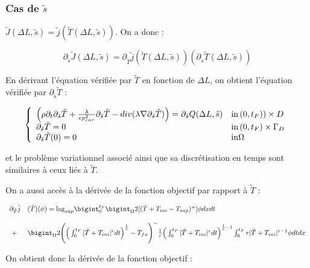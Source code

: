 \documentclass[11pt,a4paper]{article}
\begin{document}
\subsubsection*{Cas de $\tilde{s}$}

$\tilde{J}(\Delta L,\tilde{s})=\tilde{j}(\tilde{T}(\Delta L,\tilde{s}))$. On a donc :

\begin{equation}
\partial_{\tilde{s}}\tilde{J}(\Delta L,\tilde{s})=\partial_{\tilde{T}}\tilde{j}(\tilde{T}(\Delta L,\tilde{s}))(\partial_{\tilde{s}}\tilde{T}(\Delta L,\tilde{s}))
\end{equation}

En dérivant l'équation vérifiée par $\tilde{T}$ en fonction de $\Delta L$, on obtient l'équation vérifiée par $\partial_{\tilde{s}}\tilde{T}$ :

\begin{equation}
\label{eq:ChaleurDerTildes}
\left\{\begin{array}{ll}
	\Big(\rho\partial_t \partial_{\tilde{s}}\tilde{T}+\frac{\lambda}{ep_{car}^2} \partial_{\tilde{s}}\tilde{T}-div(\lambda\nabla \partial_{\tilde{s}}\tilde{T})\Big)=\partial_{\tilde{s}}Q(\Delta L,\tilde{s})& \textrm{in\,}(0,t_F))\times D \\
	\partial_{\tilde{s}}\tilde{T}=0 & \textrm{in\,}(0,t_F)\times \Gamma_D \\
	\partial_{\tilde{s}}\tilde{T}(0)=0 & \textrm{in} \Omega
\end{array}\right.
\end{equation}

et le problème variationnel associé ainsi que sa discrétisation en temps sont similaires à ceux liés à $\tilde{T}$.

On a aussi accès à la dérivée de la fonction objectif par rapport à $\tilde{T}$ :

\begin{equation}
\begin{array}{ll}
\partial_{\tilde{T}}\tilde{j}&(\tilde{T})(\phi)= \textrm{lag}_{sup} \bigint_{0}^{t_F}\bigint_{\Omega}2[(\tilde{T}+T_{ini}-T_{sup})^+]\phi dxdt\\
\\
\,\, +&\bigint_{\Omega}2\Bigg(\Big(\int_{0}^{t_F}|\tilde{T}+T_{ini}|^rdt\Big)^{\frac{1}{r}}-T_{fu}\Bigg)^-\frac{1}{r}\Big(\int_{0}^{t_F}|\tilde{T}+T_{ini}|^rdt\Big)^{\frac{1}{r}-1}\int_{0}^{t_F}r|\tilde{T}+T_{ini}|^{r-1}\phi dtdx \\
\end{array}
\end{equation}

On obtient donc la dérivée de la fonction objectif :
\end{document}
